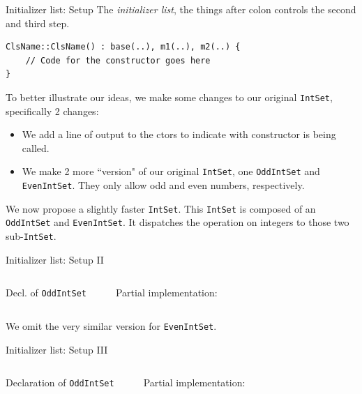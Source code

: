 \begin{frame}[fragile]{Initializer list: Setup}
The \textit{initializer list}, the things after colon controls the second and third step. 

\begin{verbatim}
ClsName::ClsName() : base(..), m1(..), m2(..) {
    // Code for the constructor goes here
}
\end{verbatim}



To better illustrate our ideas, we make some changes to our original \texttt{IntSet}, specifically 2 changes:

\begin{itemize}
	\item We add a line of output to the ctors to indicate with constructor is being called.
	\item We make 2 more ``version" of our original \texttt{IntSet}, one \texttt{OddIntSet} and \texttt{EvenIntSet}. They only allow odd and even numbers, respectively.
\end{itemize}

We now propose a slightly faster \texttt{IntSet}. This \texttt{IntSet} is composed of an \texttt{OddIntSet} and \texttt{EvenIntSet}. It dispatches the operation on integers to those two sub-\texttt{IntSet}. 
%

\end{frame}

\begin{frame}[fragile]{Initializer list: Setup II}
\begin{columns}
	
	\vspace{-.3in}
	Decl. of \texttt{OddIntSet}
	\inputminted[fontsize=\small]{c++}{code/rc8init/oddintset.h}
	
	
	\vspace{-.3in}
	Partial implementation:
	\inputminted[fontsize=\small]{c++}{code/rc8init/oddintset.cpp}
\end{columns}

We omit the very similar version for \texttt{EvenIntSet}.
\end{frame}

\begin{frame}[fragile]{Initializer list: Setup III}
\begin{columns}
	
	\vspace{-.2in}
	Declaration of \texttt{OddIntSet}
	\inputminted[fontsize=\small]{c++}{code/rc8init/fastintset.h}
	
	
	\vspace{-.2in}
	Partial implementation:
	\inputminted[fontsize=\small]{c++}{code/rc8init/fastintset.cpp}
\end{columns}

\end{frame}

